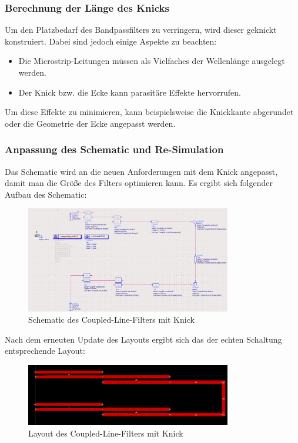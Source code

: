 \subsubsection{Berechnung der Länge des Knicks}
Um den Platzbedarf des Bandpassfilters zu verringern, wird dieser geknickt konstruiert. Dabei sind jedoch einige Aspekte zu beachten:
\begin{itemize}
    \item Die Microstrip-Leitungen müssen als Vielfaches der Wellenlänge ausgelegt werden.
    \item Der Knick bzw. die Ecke kann parasitäre Effekte hervorrufen.
\end{itemize}
Um diese Effekte zu minimieren, kann beispielsweise die Knickkante abgerundet oder die Geometrie der Ecke angepasst werden.

\subsubsection{Anpassung des Schematic und Re-Simulation}
    Das Schematic wird an die neuen Anforderungen mit dem Knick angepasst, damit man die Größe des Filters optimieren kann. Es ergibt sich folgender Aufbau des Schematic:
    \begin{figure}[H]
        \centering
        \includegraphics[width=0.8\textwidth]{Pictures/SchematicMitKnick.png}
        \caption{Schematic des Coupled-Line-Filters mit Knick}
    \end{figure}
    Nach dem erneuten Update des Layouts ergibt sich das der echten Schaltung entsprechende Layout:
    \begin{figure}[H]
        \centering
        \includegraphics[width=0.8\textwidth]{Pictures/LayoutmitKnick.png}
        \caption{Layout des Coupled-Line-Filters mit Knick}
    \end{figure}
